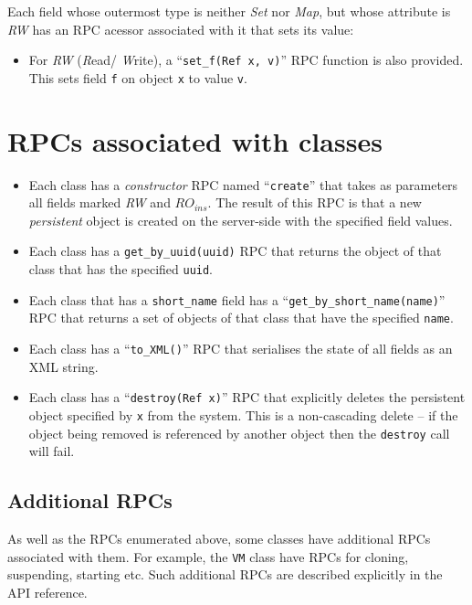 Each field whose outermost type is neither {\em Set\/} nor {\em Map\/}, 
but whose attribute is {\em RW} has an RPC acessor associated with it
that sets its value:
\begin{itemize}
\item For {\em RW\/} ({\em R\/}ead/{\em
W\/}rite), a ``{\tt set\_f(Ref x, v)}'' RPC function is also provided.
This sets field {\tt f} on object {\tt x} to value {\tt v}.
\end{itemize}

\section{RPCs associated with classes}

\begin{itemize}
\item Each class has a {\em constructor\/} RPC named ``{\tt create}'' that
takes as parameters all fields marked {\em RW\/} and
$\mathit{RO}_\mathit{ins}$. The result of this RPC is that a new {\em
persistent\/} object is created on the server-side with the specified field
values.

\item Each class has a {\tt get\_by\_uuid(uuid)} RPC that returns the object
of that class that has the specified {\tt uuid}.

\item Each class that has a {\tt short\_name} field has a
``{\tt get\_by\_short\_name(name)}'' RPC that returns a set of objects of that
class that have the specified {\tt name}.

\item Each class has a ``{\tt to\_XML()}'' RPC that serialises the
state of all fields as an XML string.

\item Each class has a ``{\tt destroy(Ref x)}'' RPC that explicitly deletes
the persistent object specified by {\tt x} from the system.  This is a
non-cascading delete -- if the object being removed is referenced by another
object then the {\tt destroy} call will fail.

\end{itemize}

\subsection{Additional RPCs}

As well as the RPCs enumerated above, some classes have additional RPCs
associated with them. For example, the {\tt VM} class have RPCs for cloning,
suspending, starting etc. Such additional RPCs are described explicitly
in the API reference.
